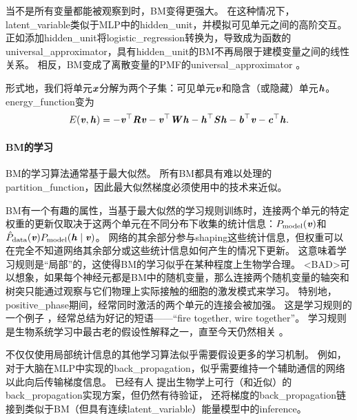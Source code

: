 当不是所有变量都能被观察到时，\gls{BM}变得更强大。
在这种情况下，\gls{latent_variable}类似于\gls{MLP}中的\gls{hidden_unit}，并模拟可见单元之间的高阶交互。
正如添加\gls{hidden_unit}将\gls{logistic_regression}转换为，导致成为函数的\gls{universal_approximator}，具有\gls{hidden_unit}的\gls{BM}不再局限于建模变量之间的线性关系。
相反，\gls{BM}变成了离散变量的\gls{PMF}的\gls{universal_approximator} \citep{LeRoux-Bengio-2008}。


形式地，我们将单元$\boldsymbol{\mathit{x}}$分解为两个子集：可见单元$\boldsymbol{\mathit{v}}$和隐含（或隐藏）单元$\boldsymbol{\mathit{h}}$。
\gls{energy_function}变为
\begin{align}
 E(\boldsymbol{\mathit{v}}, \boldsymbol{\mathit{h}}) = -\boldsymbol{\mathit{v}}^\top \boldsymbol{\mathit{R}} \boldsymbol{\mathit{v}} - \boldsymbol{\mathit{v}}^\top \boldsymbol{\mathit{W}} \boldsymbol{\mathit{h}} - \boldsymbol{\mathit{h}}^\top \boldsymbol{\mathit{S}} \boldsymbol{\mathit{h}} - \boldsymbol{\mathit{b}}^\top \boldsymbol{\mathit{v}} - \boldsymbol{\mathit{c}}^\top \boldsymbol{\mathit{h}}.
\end{align}
\paragraph{\gls{BM}的学习}\gls{BM}的学习算法通常基于最大似然。
所有\gls{BM}都具有难以处理的\gls{partition_function}，因此最大似然梯度必须使用中的技术来近似。


\gls{BM}有一个有趣的属性，当基于最大似然的学习规则训练时，连接两个单元的特定权重的更新仅取决于这两个单元在不同分布下收集的统计信息：$P_{\text{model}}(\boldsymbol{\mathit{v}})$和$\hat{P}_{\text{data}}(\boldsymbol{\mathit{v}}) P_{\text{model}}(\boldsymbol{\mathit{h}}  \mid  \boldsymbol{\mathit{v}})$。
网络的其余部分参与\gls{shaping}这些统计信息，但权重可以在完全不知道网络其余部分或这些统计信息如何产生的情况下更新。
这意味着学习规则是``局部''的，这使得\gls{BM}的学习似乎在某种程度上生物学合理。
<BAD>可以想象，如果每个神经元都是\gls{BM}中的随机变量，那么连接两个随机变量的轴突和树突只能通过观察与它们物理上实际接触的细胞的激发模式来学习。
特别地，\gls{positive_phase}期间，经常同时激活的两个单元的连接会被加强。
这是学习规则\citep{Hebb49}的一个例子 ，经常总结为好记的短语——``fire together, wire together''。
学习规则是生物系统学习中最古老的假设性解释之一，直至今天仍然相关 \citep{DelGuidice-et-al-2009}。


不仅仅使用局部统计信息的其他学习算法似乎需要假设更多的学习机制。
例如，对于大脑在\gls{MLP}中实现的\gls{back_propagation}，似乎需要维持一个辅助通信的网络以此向后传输梯度信息。
已经有人\citep{Hinton-DL2007,Bengio-arxiv2015} 提出生物学上可行（和近似）的\gls{back_propagation}实现方案，但仍然有待验证，\citet{Bengio-arxiv2015} 还将梯度的\gls{back_propagation}链接到类似于\gls{BM}（但具有连续\gls{latent_variable}）能量模型中的\gls{inference}。

